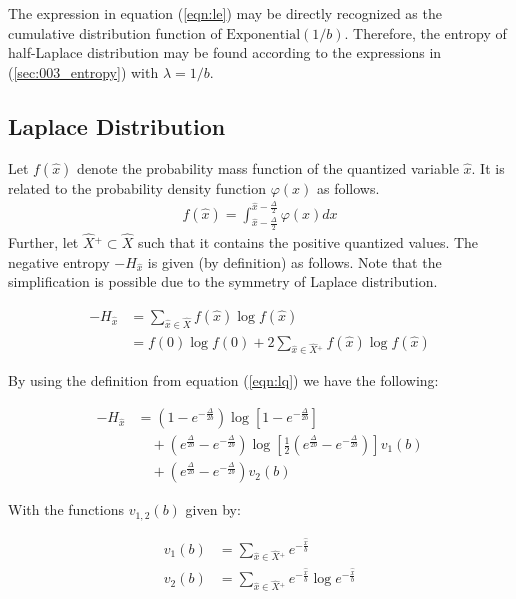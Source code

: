 The expression in equation (\ref{eqn:le}) may be directly recognized as the cumulative distribution function of $\text{Exponential}(1/b)$. Therefore, the entropy of half-Laplace distribution may be found according to the expressions in (\ref{sec:003_entropy}) with $\lambda = 1/b$. 

\subsection{Laplace Distribution}

Let $f(\hat{x})$ denote the probability mass function of the quantized variable $\hat{x}$. It is related to the probability density function $\varphi(x)$ as follows.
\begin{align} f(\hat{x}) = \int_{\hat{x} - \frac{\Delta}{2}}^{\hat{x} - \frac{\Delta}{2}} \varphi(x) dx \label{eqn:lq} \end{align}
Further, let $\hat{X}{}^+ \subset \hat{X}$ such that it contains the positive quantized values. The negative entropy $-H_{\hat{x}}$ is given (by definition) as follows. Note that the simplification is possible due to the symmetry of Laplace distribution.

\begin{align} -H_{\hat{x}} &= \sum_{\hat{x} \in \hat{X}} f(\hat{x}) \log f(\hat{x}) \\ &= f(0) \log f(0) + 2 \sum_{\hat{x} \in \hat{X}{}^+} f(\hat{x}) \log f(\hat{x}) \end{align}

By using the definition from equation (\ref{eqn:lq}) we have the following:

\begin{align} -H_{\hat{x}} &= \left(1 - e^{-\frac{\Delta}{2b}}\right) \log \left[1 - e^{-\frac{\Delta}{2b}} \right] \nonumber\\ &\quad +  \left(e^{\frac{\Delta}{2b}} - e^{-\frac{\Delta}{2b}}\right) \log \left[ \frac{1}{2} \left(e^{\frac{\Delta}{2b}} - e^{-\frac{\Delta}{2b}}\right) \right] v_1(b) \nonumber\\ &\quad + \left(e^{\frac{\Delta}{2b}} - e^{-\frac{\Delta}{2b}}\right) v_2(b) \end{align}

With the functions $v_{1,2}(b)$ given by:

\begin{align} v_1(b) &= \sum_{\hat{x} \in \hat{X}{}^+} e^{-\frac{\hat{x}}{b}} \\ v_2(b) &= \sum_{\hat{x} \in \hat{X}{}^+} e^{-\frac{\hat{x}}{b}} \log e^{-\frac{\hat{x}}{b}} \end{align}

